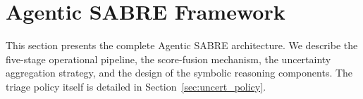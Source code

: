 \documentclass[3p]{elsarticle}
\begin{document}
\begin{table}[t]
\centering
\caption{Comparison of Agentic SABRE with representative prior ransomware and intrusion
detection systems across key design dimensions. \checkmark~= present; $\circ$~= partial;
$\times$~= absent.}
\label{tab:related_comparison}
\end{table}

\section{Agentic SABRE Framework}
\label{sec:method}

\begin{changedblock}
This section presents the complete Agentic SABRE architecture. We describe the five-stage
operational pipeline, the score-fusion mechanism, the uncertainty aggregation strategy, and
the design of the symbolic reasoning components. The triage policy itself is detailed in
Section~\ref{sec:uncert_policy}.
\end{changedblock}
\end{document}
